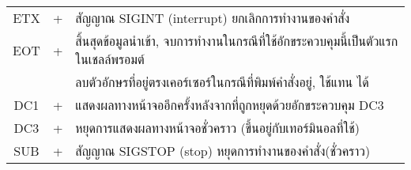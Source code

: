 \begin{thwbr}
\bigskip
{}\label{tab:controlterm}
\tablelasttail{\hline}
\begin{supertabular}{c|c|p{.5\textwidth}}
ETX & + & สัญญาณ SIGINT (interrupt) ยกเลิกการทำงานของคำสั่ง\\
EOT & + & สิ้นสุดข้อมูลนำเข้า, จบการทำงานในกรณีที่ใช้อักขระควบคุมนี้เป็นตัวแรกในเชลล์พรอมต์\\
 &  & ลบตัวอักษรที่อยู่ตรงเคอร์เซอร์ในกรณีที่พิมพ์คำสั่งอยู่, ใช้แทน  ได้\\
DC1 & + & แสดงผลทางหน้าจออีกครั้งหลังจากที่ถูกหยุดด้วยอักขระควบคุม DC3 \\
DC3 & + & หยุดการแสดงผลทางหน้าจอชั่วคราว (ขึ้นอยู่กับเทอร์มินอลที่ใช้)\\
SUB & + & สัญญาณ SIGSTOP (stop) หยุดการทำงานของคำสั่ง(ชั่วคราว)\\
\end{supertabular}
\bigskip






\end{thwbr}
